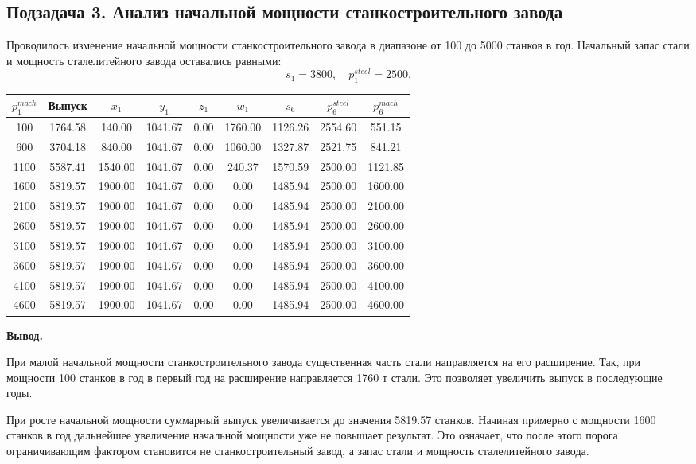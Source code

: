 \documentclass[a4paper,12pt]{article}
\begin{document}
\subsection{Подзадача 3. Анализ начальной мощности станкостроительного завода}

Проводилось изменение начальной мощности станкостроительного завода в диапазоне
от 100 до 5000 станков в год. Начальный запас стали и мощность сталелитейного
завода оставались равными:
\[
s_1 = 3800,\quad p_1^{steel} = 2500.
\]

\begin{center}
\small
\begin{tabular}{ccccccccc}
\toprule
$p_1^{mach}$ & Выпуск & $x_1$ & $y_1$ & $z_1$ & $w_1$ & $s_6$ & $p_6^{steel}$ & $p_6^{mach}$ \\
\midrule
100 & 1764.58 & 140.00 & 1041.67 & 0.00 & 1760.00 & 1126.26 & 2554.60 & 551.15 \\
600 & 3704.18 & 840.00 & 1041.67 & 0.00 & 1060.00 & 1327.87 & 2521.75 & 841.21 \\
1100 & 5587.41 & 1540.00 & 1041.67 & 0.00 & 240.37 & 1570.59 & 2500.00 & 1121.85 \\
1600 & 5819.57 & 1900.00 & 1041.67 & 0.00 & 0.00 & 1485.94 & 2500.00 & 1600.00 \\
2100 & 5819.57 & 1900.00 & 1041.67 & 0.00 & 0.00 & 1485.94 & 2500.00 & 2100.00 \\
2600 & 5819.57 & 1900.00 & 1041.67 & 0.00 & 0.00 & 1485.94 & 2500.00 & 2600.00 \\
3100 & 5819.57 & 1900.00 & 1041.67 & 0.00 & 0.00 & 1485.94 & 2500.00 & 3100.00 \\
3600 & 5819.57 & 1900.00 & 1041.67 & 0.00 & 0.00 & 1485.94 & 2500.00 & 3600.00 \\
4100 & 5819.57 & 1900.00 & 1041.67 & 0.00 & 0.00 & 1485.94 & 2500.00 & 4100.00 \\
4600 & 5819.57 & 1900.00 & 1041.67 & 0.00 & 0.00 & 1485.94 & 2500.00 & 4600.00 \\
\bottomrule
\end{tabular}
\end{center}

\textbf{Вывод.}

При малой начальной мощности станкостроительного завода существенная часть
стали направляется на его расширение. Так, при мощности 100 станков в год в
первый год на расширение направляется 1760 т стали. Это позволяет увеличить
выпуск в последующие годы.

При росте начальной мощности суммарный выпуск увеличивается до значения
5819.57 станков. Начиная примерно с мощности 1600 станков в год дальнейшее
увеличение начальной мощности уже не повышает результат. Это означает, что
после этого порога ограничивающим фактором становится не станкостроительный
завод, а запас стали и мощность сталелитейного завода.
\end{document}
